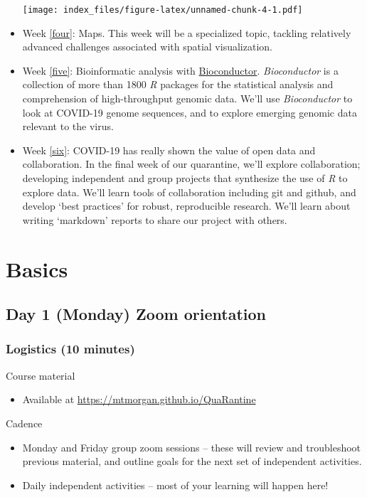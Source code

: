 \documentclass[
]{book}
\providecommand{\tightlist}{%
  \setlength{\itemsep}{0pt}\setlength{\parskip}{0pt}}
\begin{document}
\begin{itemize}
  \texttt{[image: index\_files/figure-latex/unnamed-chunk-4-1.pdf]}
\item
  Week \ref{four}: Maps. This week will be a specialized topic, tackling relatively advanced challenges associated with spatial visualization.
\item
  Week \ref{five}: Bioinformatic analysis with \href{https://bioconductor.org}{Bioconductor}. \emph{Bioconductor} is a collection of more than 1800 \emph{R} packages for the statistical analysis and comprehension of high-throughput genomic data. We'll use \emph{Bioconductor} to look at COVID-19 genome sequences, and to explore emerging genomic data relevant to the virus.
\item
  Week \ref{six}: COVID-19 has really shown the value of open data and collaboration. In the final week of our quarantine, we'll explore collaboration; developing independent and group projects that synthesize the use of \emph{R} to explore data. We'll learn tools of collaboration including git and github, and develop `best practices' for robust, reproducible research. We'll learn about writing `markdown' reports to share our project with others.
\end{itemize}

\hypertarget{one}{%
\chapter{Basics}\label{one}}

\hypertarget{day-1-monday-zoom-orientation}{%
\section{Day 1 (Monday) Zoom orientation}\label{day-1-monday-zoom-orientation}}

\hypertarget{logistics-10-minutes}{%
\subsection{Logistics (10 minutes)}\label{logistics-10-minutes}}

Course material

\begin{itemize}
\tightlist
\item
  Available at \url{https://mtmorgan.github.io/QuaRantine}
\end{itemize}

Cadence

\begin{itemize}
\tightlist
\item
  Monday and Friday group zoom sessions -- these will review and troubleshoot previous material, and outline goals for the next set of independent activities.
\item
  Daily independent activities -- most of your learning will happen here!
\end{itemize}
\end{document}
